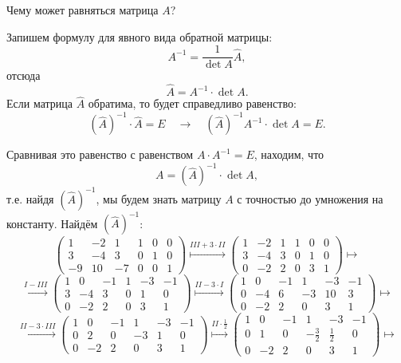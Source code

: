 \documentclass[a4paper,12pt]{article}
\begin{document}
Чему может равняться матрица $A$?
\par
\vspace{5pt}
\par
Запишем формулу для явного вида обратной матрицы:
$$A^{-1}=\frac{1}{\det A} \widehat A,$$
отсюда
$$\widehat A =A^{-1} \cdot \det A .$$
Если матрица $\widehat A$ обратима, то будет справедливо равенство:
$$(\widehat A)^{-1}\cdot \widehat A = E 
\quad \longrightarrow \quad
(\widehat A)^{-1} A^{-1} \cdot \det A = E .$$\par
Сравнивая это равенство с равенством $A \cdot A^{-1} = E$, находим, что
$$A = (\widehat A)^{-1} \cdot \det A,$$
т.е. найдя $(\widehat A)^{-1}$, мы будем знать матрицу $A$ с точностью до умножения на константу. Найдём $(\widehat A)^{-1}$:
$$
\left(\begin{array}{ccc|ccc}
1 & -2 & 1 & 1 & 0 & 0\\
3 & -4 & 3 & 0 & 1 & 0\\
-9 & 10 & -7 & 0 & 0 & 1
\end{array} \right)
\overset{III + 3 \cdot II}{\longmapsto}
\left(\begin{array}{ccc|ccc}
1 & -2 & 1 & 1 & 0 & 0\\
3 & -4 & 3 & 0 & 1 & 0\\
0 & -2 & 2 & 0 & 3 & 1
\end{array} \right)
\longmapsto
$$
$$
\overset{I - III}{\longmapsto}
\left(\begin{array}{ccc|ccc}
1 & 0 & -1 & 1 & -3 & -1\\
3 & -4 & 3 & 0 & 1 & 0\\
0 & -2 & 2 & 0 & 3 & 1
\end{array} \right)
\overset{II - 3 \cdot I}{\longmapsto}
\left(\begin{array}{ccc|ccc}
1 & 0 & -1 & 1 & -3 & -1\\
0 & -4 & 6 & -3 & 10 & 3\\
0 & -2 & 2 & 0 & 3 & 1
\end{array} \right)
\longmapsto
$$
$$
\overset{II - 3 \cdot III}{\longmapsto}
\left(\begin{array}{ccc|ccc}
1 & 0 & -1 & 1 & -3 & -1\\
0 & 2 & 0 & -3 & 1 & 0\\
0 & -2 & 2 & 0 & 3 & 1
\end{array} \right)
\overset{II \cdot \frac{1}{2}}{\longmapsto}
\left(\begin{array}{ccc|ccc}
1 & 0 & -1 & 1 & -3 & -1\\
0 & 1 & 0 & -\frac{3}{2} & \frac{1}{2} & 0\\
0 & -2 & 2 & 0 & 3 & 1
\end{array} \right)
\longmapsto
$$
\end{document}

